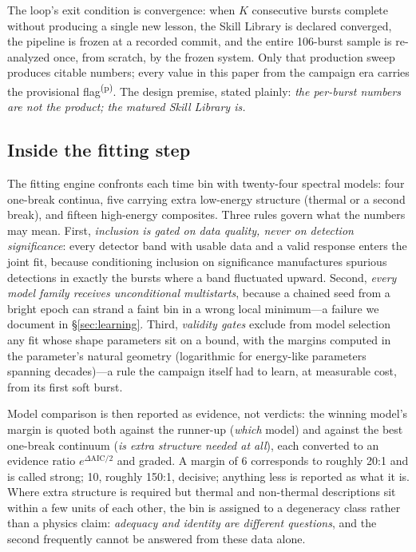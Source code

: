 \documentclass[twocolumn]{aastex631}
\newcommand{\prov}{\textsuperscript{(p)}}   %
\begin{document}
The loop's exit condition is convergence: when $K$ consecutive bursts
complete without producing a single new lesson, the Skill Library is declared
converged, the pipeline is frozen at a recorded commit, and the entire
106-burst sample is re-analyzed once, from scratch, by the frozen system.
Only that production sweep produces citable numbers; every value in this
paper from the campaign era carries the provisional flag\prov. The design
premise, stated plainly: \emph{the per-burst numbers are not the product;
the matured Skill Library is.}

\subsection{Inside the fitting step} \label{sec:fitstep}

The fitting engine confronts each time bin with twenty-four spectral models:
four one-break continua, five carrying extra low-energy structure (thermal
or a second break), and fifteen high-energy composites. Three rules govern
what the numbers may mean. First, \emph{inclusion is gated on data quality,
never on detection significance}: every detector band with usable data and a
valid response enters the joint fit, because conditioning inclusion on
significance manufactures spurious detections in exactly the bursts where a
band fluctuated upward. Second, \emph{every model family receives
unconditional multistarts}, because a chained seed from a bright epoch can
strand a faint bin in a wrong local minimum---a failure we document in
\S\ref{sec:learning}. Third, \emph{validity gates} exclude from model
selection any fit whose shape parameters sit on a bound, with the margins
computed in the parameter's natural geometry (logarithmic for
energy-like parameters spanning decades)---a rule the campaign itself had to
learn, at measurable cost, from its first soft burst.

Model comparison is then reported as evidence, not verdicts: the winning
model's margin is quoted both against the runner-up (\emph{which} model) and
against the best one-break continuum (\emph{is extra structure needed at
all}), each converted to an evidence ratio $e^{\Delta\mathrm{AIC}/2}$ and
graded. A margin of 6 corresponds to roughly 20:1 and is called strong;
10, roughly 150:1, decisive; anything less is reported as what it is. Where
extra structure is required but thermal and non-thermal descriptions sit
within a few units of each other, the bin is assigned to a degeneracy class
rather than a physics claim: \emph{adequacy and identity are different
questions}, and the second frequently cannot be answered from these data
alone.
\end{document}
